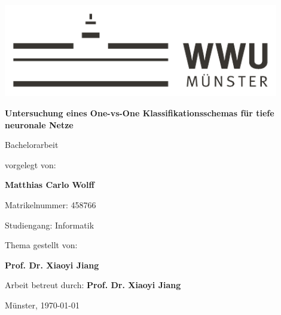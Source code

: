 \begin{centering}
\vspace*{\fill}
\includegraphics[width=12cm]{./img/wwu-logo-neu.pdf}

\vspace{2cm} 

{\LARGE
	\textbf{Untersuchung eines One-vs-One Klassifikationsschemas für tiefe neuronale Netze}\\[1.2cm]
}

{\large
	Bachelorarbeit\\[2cm]
}

{\large
	vorgelegt von:
}

{ \Large
	\textbf{Matthias Carlo Wolff}\\[1cm]
}

{\large
	Matrikelnummer: 458766\\[2mm]
}

{\large
	Studiengang: Informatik\\[1cm]
}
    
{\large
	Thema gestellt von:
}

{\Large
	\textbf{Prof. Dr. Xiaoyi Jiang}\\[1cm]
}
                               
{\large
	Arbeit betreut durch:
}
{\Large
	\textbf{Prof. Dr. Xiaoyi Jiang}\\[1cm]
}

{\large
Münster, \today
}
\vfill
\end{centering}